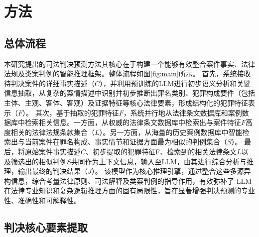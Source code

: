 

\section{\heiti 方法}
\subsection{\heiti 总体流程}

本研究提出的司法判决预测方法其核心在于构建一个能够有效整合案件事实、法律法规及类案判例的智能推理框架。整体流程如图\ref{fig:main}所示。
首先，系统接收待判决案件的详细事实描述（$C$），并利用预训练的LLM进行初步语义分析和关键信息抽取，从复杂的案情描述中识别并初步推断出罪名类别、犯罪构成要件（包括主体、主观、客体、客观）及证据特征等核心法律要素，形成结构化的犯罪特征表示（$F$）。
其次，基于抽取的犯罪特征$F$，系统并行地从法律条文数据库和案例数据库中检索相关信息。一方面，从权威的法律条文数据库中检索出与案件特征$F$高度相关的法律法规条款集合（$L$）。另一方面，从海量的历史案例数据库中智能检索出与当前案件在罪名构成、事实情节和证据方面最为相似的判例集合（$S$）。
最后，将原始案件事实描述$C$、初步提取的犯罪特征F、检索到的相关法律条文$L$以及筛选出的相似判例$S$共同作为上下文信息，输入至LLM，由其进行综合分析与推理，输出最终的判决结果（$J$）。
该模型作为核心推理引擎，通过整合这些多源异构信息，综合考量法律原则、司法解释及类案判例的指导作用，有效弥补了 LLM 在法律专业知识和复杂逻辑推理方面的固有局限性，旨在显著增强判决预测的专业性、准确性和可解释性。

\subsection{\heiti 判决核心要素提取}

